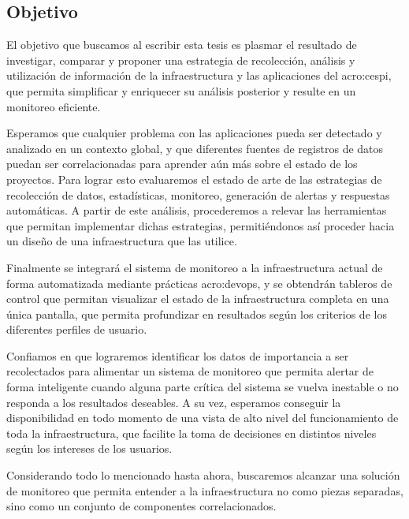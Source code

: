 \subsection{Objetivo}
\label{objetivo}

El objetivo que buscamos al escribir esta tesis es plasmar el resultado de
investigar, comparar y proponer una estrategia de recolección, análisis y
utilización de información de la infraestructura y las aplicaciones del
\gls{acro:cespi}, que permita simplificar y enriquecer su análisis posterior y
resulte en un monitoreo eficiente.

Esperamos que cualquier problema con las aplicaciones pueda ser detectado y
analizado en un contexto global, y que diferentes fuentes de registros de datos
puedan ser correlacionadas para aprender aún más sobre el estado de los
proyectos. Para lograr esto evaluaremos el estado de arte de las estrategias
de recolección de datos, estadísticas, monitoreo, generación de alertas y
respuestas automáticas. A partir de este análisis, procederemos a relevar las
herramientas que permitan implementar dichas estrategias, permitiéndonos así
proceder hacia un diseño de una infraestructura que las utilice.

Finalmente se integrará el sistema de monitoreo a la infraestructura actual de
forma automatizada mediante prácticas \gls{acro:devops}, y se obtendrán
tableros de control que permitan visualizar el estado de la infraestructura
completa en una única pantalla, que permita profundizar en resultados según los
criterios de los diferentes perfiles de usuario.

Confiamos en que lograremos identificar los datos de importancia a ser
recolectados para alimentar un sistema de monitoreo que permita alertar de
forma inteligente cuando alguna parte crítica del sistema se vuelva inestable o
no responda a los resultados deseables. A su vez, esperamos conseguir la
disponibilidad en todo momento de una vista de alto nivel del funcionamiento de
toda la infraestructura, que facilite la toma de decisiones en distintos
niveles según los intereses de los usuarios.

Considerando todo lo mencionado hasta ahora, buscaremos alcanzar una solución
de monitoreo que permita entender a la infraestructura no como piezas
separadas, sino como un conjunto de componentes correlacionados.


